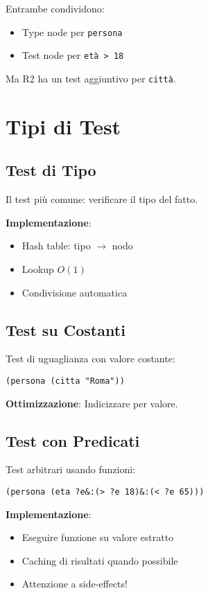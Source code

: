 Entrambe condividono:
\begin{itemize}
\item Type node per \texttt{persona}
\item Test node per \texttt{età > 18}
\end{itemize}

Ma R2 ha un test aggiuntivo per \texttt{città}.

\section{Tipi di Test}

\subsection{Test di Tipo}

Il test più comune: verificare il tipo del fatto.

\textbf{Implementazione}:
\begin{itemize}
\item Hash table: tipo $\rightarrow$ nodo
\item Lookup $O(1)$
\item Condivisione automatica
\end{itemize}

\subsection{Test su Costanti}

Test di uguaglianza con valore costante:

\begin{lstlisting}[language=CLIPS]
(persona (citta "Roma"))
\end{lstlisting}

\textbf{Ottimizzazione}: Indicizzare per valore.

\subsection{Test con Predicati}

Test arbitrari usando funzioni:

\begin{lstlisting}[language=CLIPS]
(persona (eta ?e&:(> ?e 18)&:(< ?e 65)))
\end{lstlisting}

\textbf{Implementazione}:
\begin{itemize}
\item Eseguire funzione su valore estratto
\item Caching di risultati quando possibile
\item Attenzione a side-effects!
\end{itemize}

